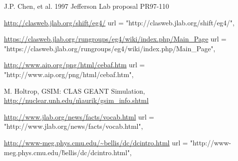  J.P. Chen, et al. 1997 Jefferson Lab proposal PR97-110 %

 \href{http://clasweb.jlab.org/shift/eg4/}{http://clasweb.jlab.org/shift/eg4/}   url = "http://clasweb.jlab.org/shift/eg4/",

 \href{https://clasweb.jlab.org/rungroups/eg4/wiki/index.php/Main\_Page}{https://clasweb.jlab.org/rungroups/eg4/wiki/index.php/Main\_Page}   url = "{https://clasweb.jlab.org/rungroups/eg4/wiki/index.php/Main\_Page}",

 \href{http://www.aip.org/png/html/cebaf.htm}{http://www.aip.org/png/html/cebaf.htm}     url = "http://www.aip.org/png/html/cebaf.htm",

 M. Holtrop, GSIM: CLAS GEANT Simulation, \href{http://nuclear.unh.edu/\textasciitilde maurik/gsim\_info.shtml}{http://nuclear.unh.edu/\~maurik/gsim\_info.shtml} 

 \href{http://www.jlab.org/news/facts/vocab.html}{http://www.jlab.org/news/facts/vocab.html}    url = "http://www.jlab.org/news/facts/vocab.html",

 \url{http://www-meg.phys.cmu.edu/\~bellis/dc/dcintro.html}     url = "http://www-meg.phys.cmu.edu/\~bellis/dc/dcintro.html",

